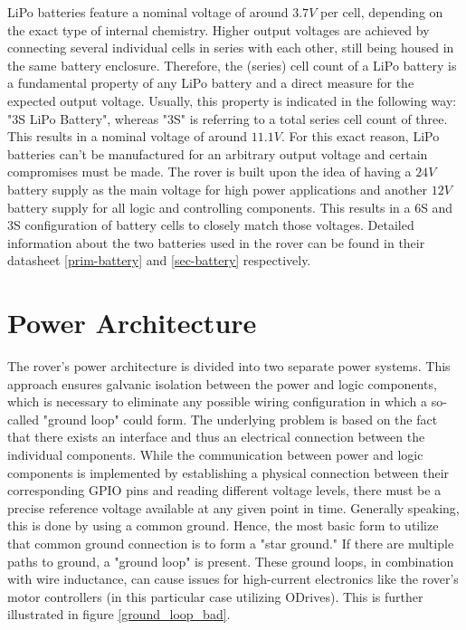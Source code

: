     \vspace{5mm}
    
    LiPo batteries feature a nominal voltage of around $3.7V$ per cell, depending on the exact type of internal chemistry. Higher output voltages are achieved by connecting several individual cells in series with each other, still being housed in the same battery enclosure. Therefore, the (series) cell count of a LiPo battery is a fundamental property of any LiPo battery and a direct measure for the expected output voltage. Usually, this property is indicated in the following way: "3S LiPo Battery", whereas "3S" is referring to a total series cell count of three. This results in a nominal voltage of around $11.1V$. For this exact reason, LiPo batteries can't be manufactured for an arbitrary output voltage and certain compromises must be made. The rover is built upon the idea of having a $24V$ battery supply as the main voltage for high power applications and another $12V$ battery supply for all logic and controlling components. This results in a 6S and 3S configuration of battery cells to closely match those voltages. Detailed information about the two batteries used in the rover can be found in their datasheet \ref{prim-battery} and \ref{sec-battery} respectively.

    \clearpage      
    
\section{Power Architecture}

    The rover's power architecture is divided into two separate power systems. This approach ensures galvanic isolation between the power and logic components, which is necessary to eliminate any possible wiring configuration in which a so-called "ground loop" could form. The underlying problem is based on the fact that there exists an interface and thus an electrical connection between the individual components. While the communication between power and logic components is implemented by establishing a physical connection between their corresponding GPIO pins and reading different voltage levels, there must be a precise reference voltage available at any given point in time. Generally speaking, this is done by using a common ground. Hence, the most basic form to utilize that common ground connection is to form a "star ground." If there are multiple paths to ground, a "ground loop" is present. These ground loops, in combination with wire inductance, can cause issues for high-current electronics like the rover's motor controllers (in this particular case utilizing ODrives). This is further illustrated in figure \ref{ground_loop_bad}.
    
